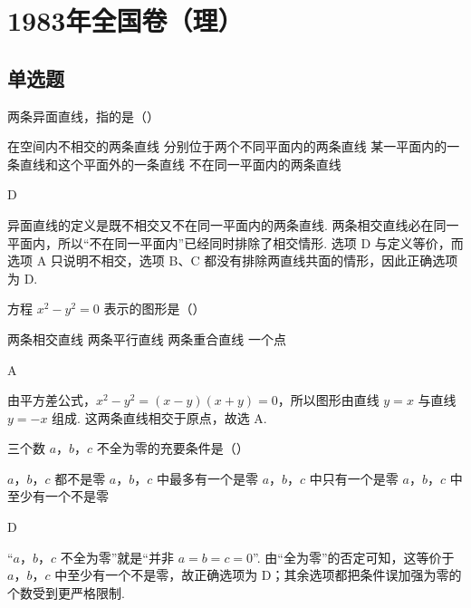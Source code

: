 \documentclass[UTF8,a4paper,oneside,11pt]{ctexbook}
\begin{document}
\mainmatter

\chapter{1983年全国卷（理）}

\section{单选题}

\begin{problem}
两条异面直线，指的是（\quad）

\choices
    {在空间内不相交的两条直线}
    {分别位于两个不同平面内的两条直线}
    {某一平面内的一条直线和这个平面外的一条直线}
    {不在同一平面内的两条直线}

\begin{answer}
D
\end{answer}

\begin{solution}
异面直线的定义是既不相交又不在同一平面内的两条直线. 两条相交直线必在同一平面内，所以“不在同一平面内”已经同时排除了相交情形. 选项 D 与定义等价，而选项 A 只说明不相交，选项 B、C 都没有排除两直线共面的情形，因此正确选项为 D.
\end{solution}
\end{problem}

\begin{problem}
方程 \(x^{2} - y^{2} = 0\) 表示的图形是（\quad）

\choices
    {两条相交直线}
    {两条平行直线}
    {两条重合直线}
    {一个点}

\begin{answer}
A
\end{answer}

\begin{solution}
由平方差公式，\(x^{2}-y^{2}=(x-y)(x+y)=0\)，所以图形由直线 \(y=x\) 与直线 \(y=-x\) 组成. 这两条直线相交于原点，故选 A.
\end{solution}
\end{problem}

\begin{problem}
三个数 \(a\)，\(b\)，\(c\) 不全为零的充要条件是（\quad）

\choices
    {\(a\)，\(b\)，\(c\) 都不是零}
    {\(a\)，\(b\)，\(c\) 中最多有一个是零}
    {\(a\)，\(b\)，\(c\) 中只有一个是零}
    {\(a\)，\(b\)，\(c\) 中至少有一个不是零}

\begin{answer}
D
\end{answer}

\begin{solution}
“\(a\)，\(b\)，\(c\) 不全为零”就是“并非 \(a=b=c=0\)”. 由“全为零”的否定可知，这等价于 \(a\)，\(b\)，\(c\) 中至少有一个不是零，故正确选项为 D；其余选项都把条件误加强为零的个数受到更严格限制.
\end{solution}
\end{problem}
\end{document}
